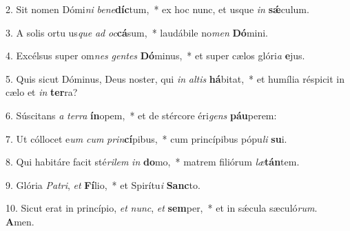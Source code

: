 2. Sit nomen Dómi\textit{ni} \textit{be}\textit{ne}\textbf{díc}tum,~*  ex hoc nunc, et usque \textit{in} \textbf{sǽ}culum.\

3. A solis ortu us\textit{que} \textit{ad} \textit{oc}\textbf{cá}sum,~*  laudábile no\textit{men} \textbf{Dó}mini.\

4. Excélsus super om\textit{nes} \textit{gen}\textit{tes} \textbf{Dó}minus,~*  et super cælos glóri\textit{a} \textbf{e}jus.\

5. Quis sicut Dóminus, Deus noster, qui \textit{in} \textit{al}\textit{tis} \textbf{há}bitat,~*  et humília réspicit in cælo et \textit{in} \textbf{ter}ra?\

6. Súscitans \textit{a} \textit{ter}\textit{ra} \textbf{ín}opem,~*  et de stércore éri\textit{gens} \textbf{páu}perem:\

7. Ut cóllocet e\textit{um} \textit{cum} \textit{prin}\textbf{cí}pibus,~*  cum princípibus pópu\textit{li} \textbf{su}i.\

8. Qui habitáre facit sté\textit{ri}\textit{lem} \textit{in} \textbf{do}mo,~*  matrem filiórum \textit{læ}\textbf{tán}tem.\

9. Glória \textit{Pa}\textit{tri}, \textit{et} \textbf{Fí}lio,~*  et Spirítu\textit{i} \textbf{Sanc}to.\

10. Sicut erat in princípio, \textit{et} \textit{nunc}, \textit{et} \textbf{sem}per,~*  et in sǽcula sæculó\textit{rum}. \textbf{A}men.\

